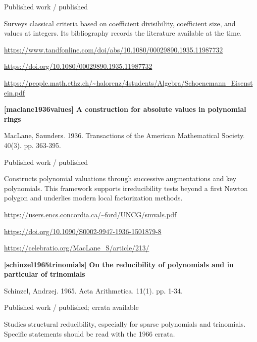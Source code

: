 \documentclass[11pt,a4paper,oneside,openany]{book}
\begin{document}
{\small\sffamily\color{atlasgold}Published work / published}\par
\color{black} Surveys classical criteria based on coefficient divisibility, coefficient size, and values at integers. Its bibliography records the literature available at the time.\par
{\footnotesize\url{https://www.tandfonline.com/doi/abs/10.1080/00029890.1935.11987732}}\par
{\footnotesize\url{https://doi.org/10.1080/00029890.1935.11987732}}\par
{\footnotesize\url{https://people.math.ethz.ch/~halorenz/4students/Algebra/Schoenemann_Eisenstein.pdf}}\par
\vspace{9pt}
\hypertarget{ref:maclane1936values}{}
{\sffamily\bfseries\color{atlasgreen}[maclane1936values] A construction for absolute values in polynomial rings}\par
\color{black} MacLane, Saunders. 1936. Transactions of the American Mathematical Society. 40(3). pp. 363-395.\par
{\small\sffamily\color{atlasgold}Published work / published}\par
\color{black} Constructs polynomial valuations through successive augmentations and key polynomials. This framework supports irreducibility tests beyond a first Newton polygon and underlies modern local factorization methods.\par
{\footnotesize\url{https://users.encs.concordia.ca/~ford/UNCG/smvals.pdf}}\par
{\footnotesize\url{https://doi.org/10.1090/S0002-9947-1936-1501879-8}}\par
{\footnotesize\url{https://celebratio.org/MacLane_S/article/213/}}\par
\vspace{9pt}
\hypertarget{ref:schinzel1965trinomials}{}
{\sffamily\bfseries\color{atlasgreen}[schinzel1965trinomials] On the reducibility of polynomials and in particular of trinomials}\par
\color{black} Schinzel, Andrzej. 1965. Acta Arithmetica. 11(1). pp. 1-34.\par
{\small\sffamily\color{atlasgold}Published work / published; errata available}\par
\color{black} Studies structural reducibility, especially for sparse polynomials and trinomials. Specific statements should be read with the 1966 errata.\par
\end{document}
